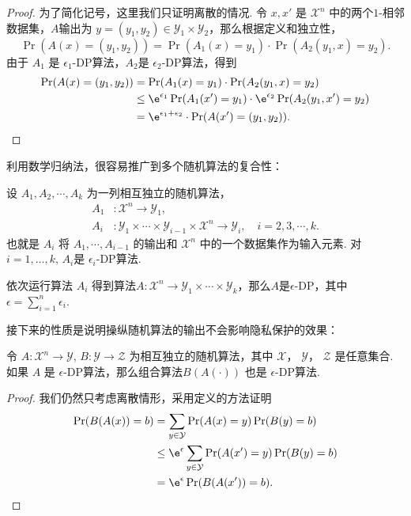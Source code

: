 \begin{proof}
为了简化记号，这里我们只证明离散的情况. 令 $x,x'$ 是 $\mathcal X^n$ 中的两个$1$-相邻数据集，$A$输出为 $y = (y_1, y_2) \in \mathcal Y_1 \times \mathcal Y_2$，那么根据定义和独立性，
    \[
    \Pr(A(x) = (y_1, y_2)) = \Pr(A_1(x) = y_1) \cdot \Pr(A_2(y_1, x) = y_2).
    \]
由于 $A_1$ 是 $\epsilon_1$-DP算法，$A_2$是 $\epsilon_2$-DP算法，得到
    \[
    \begin{aligned}
        \Pr(A(x) = (y_1, y_2)) &= \Pr(A_1(x) = y_1) \cdot \Pr(A_2(y_1, x) = y_2)\\
        &\leq \e^{\epsilon_1} \Pr(A_1(x') = y_1) \cdot \e^{\epsilon_2} \Pr(A_2(y_1, x') = y_2) \\
        &= \e^{\epsilon_1 + \epsilon_2} \cdot \Pr(A(x') = (y_1, y_2)).
    \end{aligned}
    \]
\end{proof}

利用数学归纳法，很容易推广到多个随机算法的复合性：

\begin{proposition}\label{prop:composition-multi}
    设 $A_1, A_2, \cdots , A_k$ 为一列相互独立的随机算法， 
    \begin{align*}
        A_1&: \mathcal X^n \to \mathcal Y_1,\\
        A_i&: \mathcal Y_1 \times \cdots \times \mathcal Y_{i-1} \times \mathcal X^n \to \mathcal Y_i,\quad i = 2, 3, \cdots, k.
    \end{align*}
    也就是 $A_i$ 将 $A_1, \cdots, A_{i-1}$ 的输出和 $\mathcal X^n$ 中的一个数据集作为输入元素. 对$i=1,\dots,k$, $A_i$是 $\epsilon_i$-DP算法. 
        
    依次运行算法 $A_i$ 得到算法$A : \mathcal X^n \to \mathcal Y_1 \times \cdots \times \mathcal Y_k$，那么$A$是$\epsilon$-DP，其中$\epsilon = \sum_{i=1}^n \epsilon_i$.
\end{proposition}

接下来的性质是说明操纵随机算法的输出不会影响隐私保护的效果：

\begin{proposition}[后处理]\label{prop:post-processing}
    令 $A : \mathcal X^n \to \mathcal Y$, $B : \mathcal Y \to \mathcal Z$ 为相互独立的随机算法，其中 $\mathcal X$， $\mathcal Y$， $\mathcal Z$ 是任意集合. 如果 $A$ 是 $\epsilon$-DP算法，那么组合算法$ B(A(\cdot))$ 也是 $\epsilon$-DP算法.
\end{proposition}
\begin{proof}
我们仍然只考虑离散情形，采用定义的方法证明
    \[
    \begin{aligned}
        \Pr(B(A(x)) = b) &= \sum_{y \in \mathcal Y} \Pr(A(x) = y) \Pr(B(y) = b) \\
        &\leq \e^{\epsilon} \sum_{y\in \mathcal Y}\Pr(A(x') = y)\Pr(B(y) = b)\\
        &= \e^{\epsilon}\Pr(B(A(x')) = b).
    \end{aligned}
    \]
\end{proof}

